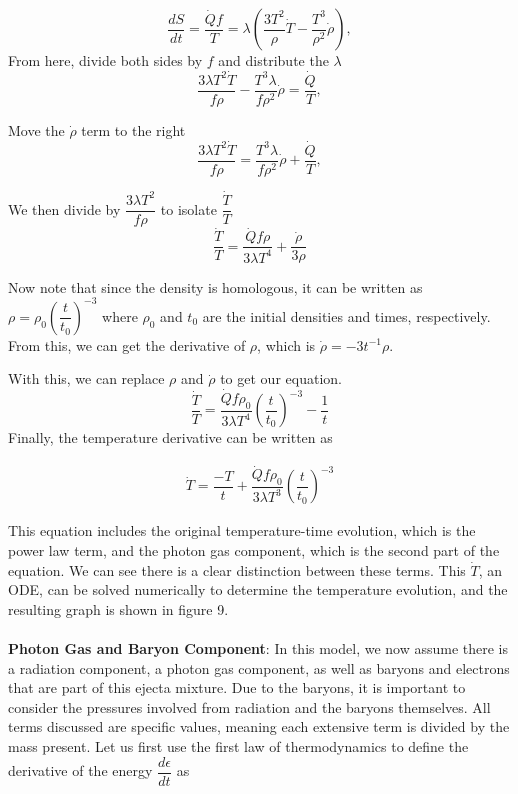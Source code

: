 \documentclass[11pt,a4paper]{article}
\begin{document}
$$ \dfrac{dS}{dt} = \dfrac{\dot{Q} f}{T} = \lambda \left(\dfrac{3T^2}{\rho}\dot{T} - \dfrac{T^3}{\rho^2}\dot{\rho} \right),$$ From here, divide both sides by $f$ and distribute the $\lambda$
$$ \dfrac{3 \lambda T^2 \dot{T}}{f \rho} - \dfrac{T^3 \lambda}{f \rho^2}\dot{\rho} = \dfrac{\dot{Q}}{T}, $$

Move the $\dot{\rho}$ term to the right 
$$ \dfrac{3 \lambda T^2 \dot{T}}{f \rho} = \dfrac{T^3 \lambda}{f \rho^2}\dot{\rho} + \dfrac{\dot{Q}}{T}, $$

We then divide by $\dfrac{3 \lambda T^2}{f \rho} $ to isolate $\dfrac{\dot{T}}{T}$
$$ \dfrac{\dot{T}}{T} = \dfrac{\dot{Q} f \rho}{3 \lambda T^4} + \dfrac{\dot{\rho}}{3 \rho} $$ 

Now note that since the density is homologous, it can be written as $ \rho = \rho_0 \left(\dfrac{t}{t_0} \right)^{-3} $ where $\rho_0$ and $t_0$ are the initial densities and times, respectively. From this, we can get the derivative of $\rho$, which is $ \dot{\rho} = -3t^{-1} \rho $. 

With this, we can replace $\rho$ and $\dot{\rho}$ to get our equation.
$$ \dfrac{\dot{T}}{T} = \dfrac{\dot{Q} f \rho_0}{3 \lambda T^4} \left( \dfrac{t}{t_0} \right) ^{-3} - \dfrac{1}{t} $$ Finally, the temperature derivative can be written as 

\begin{align}
	\dot{T} = \dfrac{-T}{t} + \dfrac{\dot{Q} f \rho_0}{3 \lambda T^3} 	\left( \dfrac{t}{t_0} \right) ^{-3} 
\end{align}

This equation includes the original temperature-time evolution, which is the power law term, and the photon gas component, which is the second part of the equation. We can see there is a clear distinction between these terms.  This 
$\dot{T}$, an ODE, can be solved numerically to determine the temperature evolution, and the resulting graph is shown in figure 9.
\\\\

\textbf{Photon Gas and Baryon Component}: In this model, we now assume there is a radiation component, a photon gas component, as well as baryons and electrons that are part of this ejecta mixture. Due to the baryons, it is important to consider the pressures involved from radiation and the baryons themselves. All terms discussed are specific values, meaning each extensive term is divided by the mass present. Let us first use the first law of thermodynamics to define the derivative of the energy $\dfrac{d \epsilon}{dt}$ as
\end{document}
